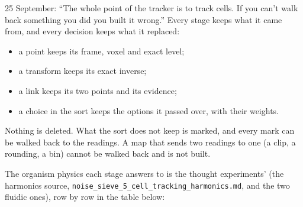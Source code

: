 25 September: “The whole point of the tracker is to track cells. If you can't walk back something you did you built it wrong.” Every stage keeps what it came from, and every decision keeps what it replaced:

\begin{itemize}
\item a point keeps its frame, voxel and exact level;
\item a transform keeps its exact inverse;
\item a link keeps its two points and its evidence;
\item a choice in the sort keeps the options it passed over, with their weights.
\end{itemize}

Nothing is deleted. What the sort does not keep is marked, and every mark can be walked back to the readings. A map that sends two readings to one (a clip, a rounding, a bin) cannot be walked back and is not built.

The organism physics each stage answers to is the thought experiments' (the harmonics source, \texttt{noise\_\allowbreak{}sieve\_\allowbreak{}5\_\allowbreak{}cell\_\allowbreak{}tracking\_\allowbreak{}harmonics.\allowbreak{}md}, and the two fluidic ones), row by row in the table below:

